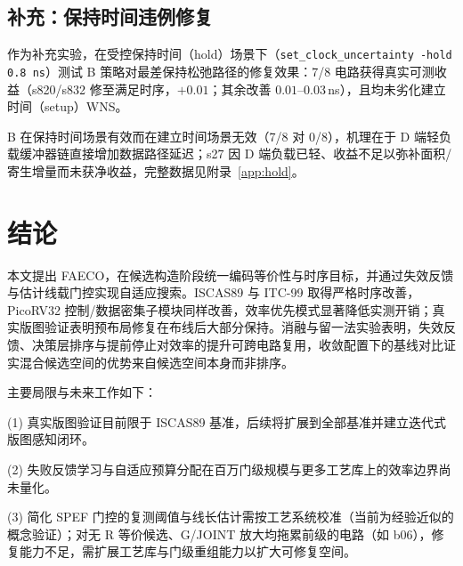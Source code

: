 \documentclass[journal]{IEEEtran}
\begin{document}
\subsection{补充：保持时间违例修复}\label{sec:hold}

作为补充实验，在受控保持时间（hold）场景下（\texttt{set\_clock\_uncertainty -hold 0.8\,ns}）测试 B 策略对最差保持松弛路径的修复效果：7/8 电路获得真实可测收益（s820/s832 修至满足时序，$+0.01$；其余改善 $0.01$--$0.03\,$ns），且均未劣化建立时间（setup）WNS。

B 在保持时间场景有效而在建立时间场景无效（7/8 对 0/8），机理在于 D 端轻负载缓冲器链直接增加数据路径延迟；s27 因 D 端负载已轻、收益不足以弥补面积/寄生增量而未获净收益，完整数据见附录~\ref{app:hold}。

\section{结论}\label{sec:conclusion}

本文提出 FAECO，在候选构造阶段统一编码等价性与时序目标，并通过失效反馈与估计线载门控实现自适应搜索。ISCAS89 与 ITC-99 取得严格时序改善，PicoRV32 控制/数据密集子模块同样改善，效率优先模式显著降低实测开销；真实版图验证表明预布局修复在布线后大部分保持。消融与留一法实验表明，失效反馈、决策层排序与提前停止对效率的提升可跨电路复用，收敛配置下的基线对比证实混合候选空间的优势来自候选空间本身而非排序。

主要局限与未来工作如下：

(1) 真实版图验证目前限于 ISCAS89 基准，后续将扩展到全部基准并建立迭代式版图感知闭环。

(2) 失败反馈学习与自适应预算分配在百万门级规模与更多工艺库上的效率边界尚未量化。

(3) 简化 SPEF 门控的复测阈值与线长估计需按工艺系统校准（当前为经验近似的概念验证）；对无 R 等价候选、G/JOINT 放大均拖累前级的电路（如 b06），修复能力不足，需扩展工艺库与门级重组能力以扩大可修复空间。
\end{document}
